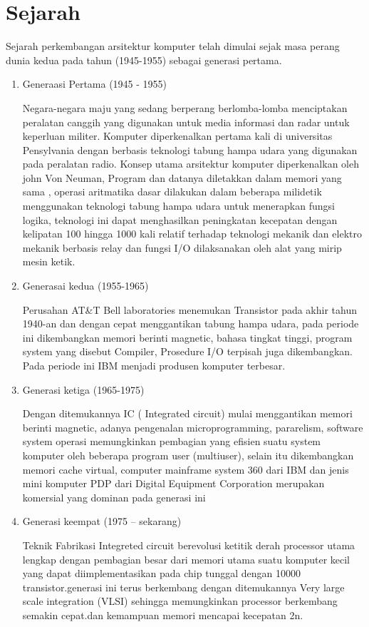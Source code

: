 \section{Sejarah}
Sejarah perkembangan arsitektur komputer telah dimulai sejak masa perang dunia kedua pada tahun (1945-1955) sebagai generasi pertama.
\begin{enumerate}
\item Generaasi Pertama (1945 - 1955)

Negara-negara maju yang sedang berperang berlomba-lomba menciptakan peralatan canggih yang digunakan untuk media informasi dan radar  untuk keperluan militer. Komputer diperkenalkan pertama kali di universitas Pensylvania dengan berbasis teknologi tabung hampa udara  yang digunakan pada peralatan radio. Konsep utama arsitektur komputer diperkenalkan oleh john Von Neuman,
Program dan datanya diletakkan dalam memori yang sama , operasi aritmatika dasar dilakukan dalam beberapa milidetik menggunakan teknologi tabung hampa udara untuk menerapkan fungsi logika, teknologi ini dapat menghasilkan peningkatan kecepatan  dengan kelipatan 100 hingga 1000 kali relatif terhadap teknologi mekanik dan elektro mekanik berbasis relay dan  fungsi I/O dilaksanakan oleh alat yang mirip mesin ketik.

\item Generasai kedua (1955-1965)

Perusahan AT\&T Bell laboratories menemukan Transistor pada akhir tahun 1940-an dan dengan cepat menggantikan tabung hampa udara, pada  periode ini dikembangkan memori berinti magnetic, bahasa tingkat tinggi, program system yang disebut Compiler, Prosedure I/O terpisah juga dikembangkan. Pada periode ini IBM menjadi produsen komputer terbesar.

\item Generasi ketiga (1965-1975)

Dengan ditemukannya  IC ( Integrated circuit) mulai menggantikan memori berinti magnetic, adanya pengenalan microprogramming, pararelism, software system operasi memungkinkan pembagian yang efisien suatu system komputer oleh beberapa program user (multiuser), selain itu dikembangkan memori cache virtual, computer  mainframe system 360 dari IBM dan jenis mini komputer PDP dari Digital Equipment Corporation merupakan komersial yang dominan pada generasi ini

\item Generasi keempat (1975 – sekarang)

Teknik Fabrikasi Integreted circuit berevolusi  ketitik derah processor utama lengkap dengan pembagian besar dari memori utama suatu komputer kecil yang dapat diimplementasikan pada chip tunggal dengan 10000 transistor.generasi ini terus berkembang dengan ditemukannya Very large scale integration (VLSI) sehingga memungkinkan processor berkembang semakin cepat.dan kemampuan memori mencapai kecepatan 2n. 


\end{enumerate}



